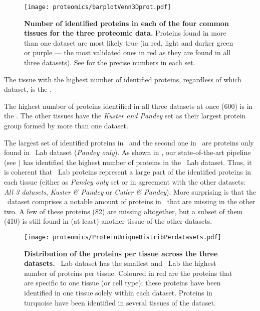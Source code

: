 \begin{figure}[!htbp]
    \texttt{[image: proteomics/barplotVenn3Dprot.pdf]}\centering
    \vspace{-3mm}
    \caption[Identified proteins across the 4 shared tissues for the 3 datasets]%
    {\label{fig:barplot3Dvennprot}\textbf{Number of identified
    proteins in each of the four common tissues for the three proteomic data.}
    Proteins found in more than one dataset are most likely true (in
    red, light and darker green or purple --- the most validated ones in red
    as they are found in all three datasets).
    See  for the precise numbers in each set.}
\end{figure}

The tissue with the highest number of identified proteins,
regardless of which dataset,
is the \ovary.\mybr\

The highest number of proteins identified in all three datasets at once (600)
is in the \heart.
The other tissues have
the \emph{Kuster and Pandey} set as
their largest protein group formed by more than one dataset.\mybr\

The largest set of identified proteins in \pancreas\
and the second one in \ovary\ are proteins only found in \pandey\ Lab dataset
(\emph{Pandey only}).
As shown in ,
our state-of-the-art pipeline (see ) has identified
the highest number of proteins in the \pandey\  Lab dataset.
Thus, it is coherent that \pandey\ Lab proteins represent a large part of
the identified proteins in each tissue (either as \emph{Pandey only} set or
in agreement with the other datasets:
\emph{All 3 datasets}, \emph{Kuster \& Pandey} or \emph{Cutler \& Pandey}).
More surprising is that the \cutler\ dataset comprises a notable amount of
proteins in \lung\ that are missing in the other two.
A few of these proteins (82) are missing altogether,
but a subset of them (410) is still found
in (at least) another tissue of the other datasets.\mybr\

\begin{figure}[!htpb]
    \texttt{[image: proteomics/ProteinUniqueDistribPerdatasets.pdf]}\centering
    \caption[Distribution of the proteins per tissue]{\label{fig:distribProtUniq3D}%
    \textbf{Distribution of the proteins per tissue across the three datasets.}
    \cutler\ Lab dataset has the smallest and \pandey\ Lab the highest number of proteins
    per tissue.
    Coloured in red are the proteins that are specific to one tissue (or cell type);
    these proteins have been identified in one tissue solely within each dataset.
    Proteins in turquoise have been identified in several tissues of the dataset.}
\end{figure}

